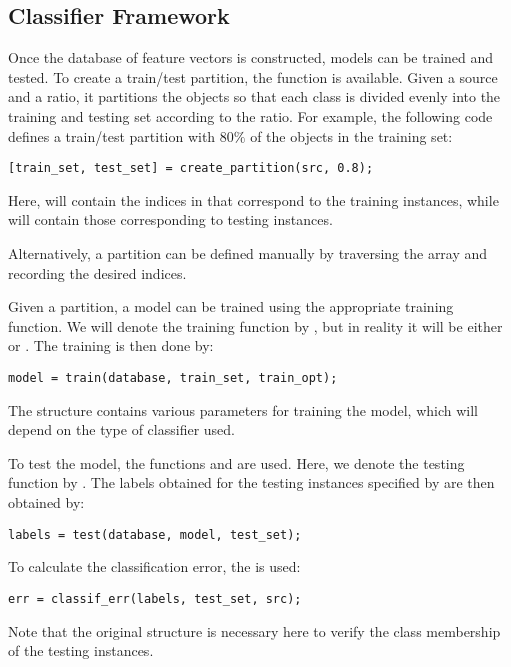 \documentclass{article}
\begin{document}
\subsection{Classifier Framework}
Once the database of feature vectors is constructed, models can be trained and tested. To create a train/test partition, the function  is available. Given a source  and a ratio, it partitions the objects so that each class is divided evenly into the training and testing set according to the ratio. For example, the following code defines a train/test partition with $80\%$ of the objects in the training set:
\begin{lstlisting}
[train_set, test_set] = create_partition(src, 0.8);
\end{lstlisting}
Here,  will contain the indices in  that correspond to the training instances, while  will contain those corresponding to testing instances.

Alternatively, a partition can be defined manually by traversing the  array and recording the desired indices.

Given a partition, a model can be trained using the appropriate training function. We will denote the training function by , but in reality it will be either  or . The training is then done by:
\begin{lstlisting}
model = train(database, train_set, train_opt);
\end{lstlisting}
The structure  contains various parameters for training the model, which will depend on the type of classifier used.

To test the model, the functions  and  are used. Here, we denote the testing function by . The labels obtained for the testing instances specified by  are then obtained by:
\begin{lstlisting}
labels = test(database, model, test_set);
\end{lstlisting}
To calculate the classification error, the  is used:
\begin{lstlisting}
err = classif_err(labels, test_set, src);
\end{lstlisting}
Note that the original  structure is necessary here to verify the class membership of the testing instances.
\end{document}
